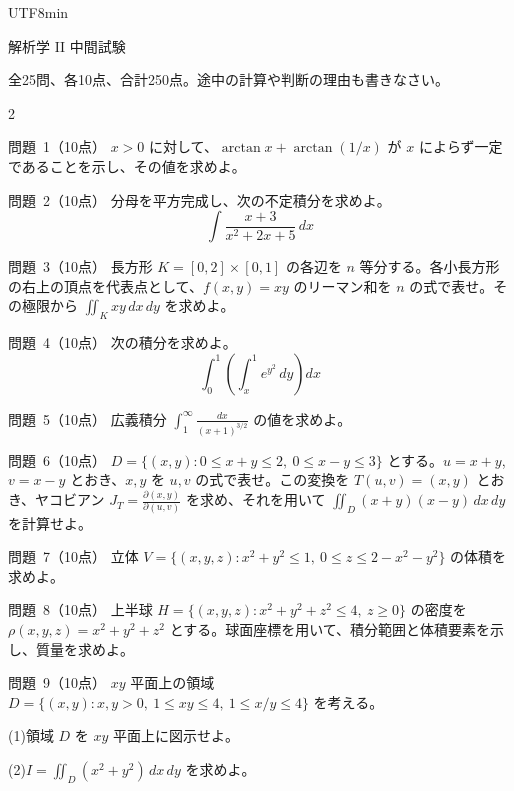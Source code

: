 \documentclass[a4paper,11pt]{article}
\begin{document}
\ifPDFTeX
\begin{CJK}{UTF8}{min}
\fi

\newcommand{\problem}[2]{\par\noindent\mbox{問題 #1（#2点）}\enspace\ignorespaces}

\begin{center}
{\Large 解析学 II 中間試験}\\[0.4em]
\end{center}

全25問、各10点、合計250点。途中の計算や判断の理由も書きなさい。

\begin{multicols}{2}
\raggedcolumns
\problem{1}{10}
$x>0$ に対して、$\arctan x+\arctan(1/x)$ が $x$ によらず一定であることを示し、その値を求めよ。

\problem{2}{10}
分母を平方完成し、次の不定積分を求めよ。
$$
\int\frac{x+3}{x^2+2x+5}\,dx
$$

\problem{3}{10}
長方形 $K=[0,2]\times[0,1]$ の各辺を $n$ 等分する。各小長方形の右上の頂点を代表点として、$f(x,y)=xy$ のリーマン和を $n$ の式で表せ。その極限から $\iint_K xy\,dx\,dy$ を求めよ。

\problem{4}{10}
次の積分を求めよ。
$$
\int_0^1\left(\int_x^1 e^{y^2}\,dy\right)dx
$$

\problem{5}{10}
広義積分 $\displaystyle\int_1^\infty\frac{dx}{(x+1)^{3/2}}$ の値を求めよ。

\problem{6}{10}
$D=\{(x,y):0\le x+y\le 2,\ 0\le x-y\le 3\}$ とする。$u=x+y$, $v=x-y$ とおき、$x,y$ を $u,v$ の式で表せ。この変換を $T(u,v)=(x,y)$ とおき、ヤコビアン $J_T=\frac{\partial(x,y)}{\partial(u,v)}$ を求め、それを用いて $\iint_D(x+y)(x-y)\,dx\,dy$ を計算せよ。

\problem{7}{10}
立体 $V=\{(x,y,z):x^2+y^2\le 1,\ 0\le z\le 2-x^2-y^2\}$ の体積を求めよ。

\problem{8}{10}
上半球 $H=\{(x,y,z):x^2+y^2+z^2\le 4,\ z\ge 0\}$ の密度を $\rho(x,y,z)=x^2+y^2+z^2$ とする。球面座標を用いて、積分範囲と体積要素を示し、質量を求めよ。

\problem{9}{10}
$xy$ 平面上の領域 $D=\{(x,y):x,y>0,\ 1\le xy\le 4,\ 1\le x/y\le 4\}$ を考える。
\par (1)\enspace 領域 $D$ を $xy$ 平面上に図示せよ。
\par (2)\enspace $I=\iint_D(x^2+y^2)\,dx\,dy$ を求めよ。


\end{multicols}
\end{CJK}
\end{document}
